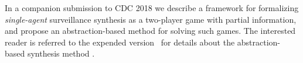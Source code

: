 In a companion submission to CDC 2018 we describe a framework for formalizing \emph{single-agent} surveillance synthesis as a two-player game with partial information, and propose an abstraction-based method for solving such games. The interested reader is referred to the expended version~\cite{arxiv} for details about the abstraction-based synthesis method .



